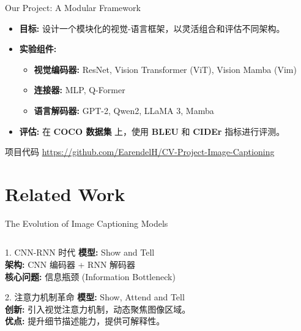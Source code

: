 \documentclass{beamer}
\begin{document}
\begin{CJK}{UTF8}{gbsn}
\begin{frame}{Our Project: A Modular Framework}
    \begin{itemize}
        \item \textbf{目标:} 设计一个模块化的视觉-语言框架，以灵活组合和评估不同架构。
        \item \textbf{实验组件:}
        \begin{itemize}
            \item \textbf{视觉编码器:} ResNet, Vision Transformer (ViT), Vision Mamba (Vim)
            \item \textbf{连接器:} MLP, Q-Former
            \item \textbf{语言解码器:} GPT-2, Qwen2, LLaMA 3, Mamba
        \end{itemize}
        \item \textbf{评估:} 在 \textbf{COCO 数据集} 上，使用 \textbf{BLEU} 和 \textbf{CIDEr} 指标进行评测。
    \end{itemize}
    
    \vfill
    \begin{block}{项目代码}
        \url{https://github.com/EarendelH/CV-Project-Image-Captioning}
    \end{block}
\end{frame}

\section{Related Work}

\begin{frame}{The Evolution of Image Captioning Models}
    \begin{columns}[T]
        \begin{column}{0.5\textwidth}
            \begin{block}{1. CNN-RNN 时代}
                \textbf{模型:} Show and Tell \\
                \textbf{架构:} CNN 编码器 + RNN 解码器 \\
                \textbf{核心问题:} 信息瓶颈 (Information Bottleneck)
            \end{block}
            
            \begin{block}{2. 注意力机制革命}
                 \textbf{模型:} Show, Attend and Tell \\
                 \textbf{创新:} 引入视觉注意力机制，动态聚焦图像区域。\\
                 \textbf{优点:} 提升细节描述能力，提供可解释性。
            \end{block}
        \end{column}
        

\end{columns}
\end{frame}
\end{CJK}
\end{document}
